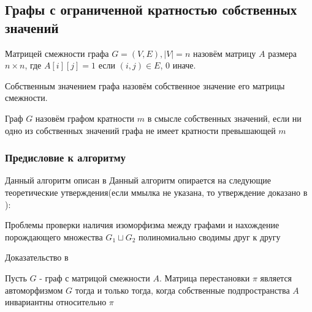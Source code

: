 \subsection{Графы с ограниченной кратностью собственных значений}

\begin{definition}
    Матрицей смежности графа $G=(V, E), |V|=n$ назовём матрицу $A$ размера $n \times n$, где $A[i][j] = 1$ если $(i, j) \in E$, 0 иначе.
\end{definition}
\begin{definition}
    Собственным значением графа назовём собственное значение его матрицы смежности.
\end{definition}
\begin{definition}
    Граф $G$ назовём графом кратности $m$ в смысле собственных значений, если ни одно из собственных значений графа не имеет кратности превышающей $m$ 
\end{definition}

\subsubsection*{Предисловие к алгоритму}
Данный алгоритм описан в \cite{8}
Данный алгоритм опирается на следующие теоретические утверждения(если ммылка не указана, то утверждение доказано в \cite{8}):
\begin{lemma}
    Проблемы проверки наличия изоморфизма между графами и нахождение порождающего множества $G_1 \sqcup G_2$ полиномиально сводимы друг к другу
\end{lemma}
Доказательство в \cite{7}

\begin{lemma}
    Пусть $G$ - граф с матрицой смежности $A$. Матрица перестановки $\pi$ является автоморфизмом $G$ тогда и только тогда, когда собственные подпространства $A$ инвариантны относительно $\pi$
\end{lemma}


